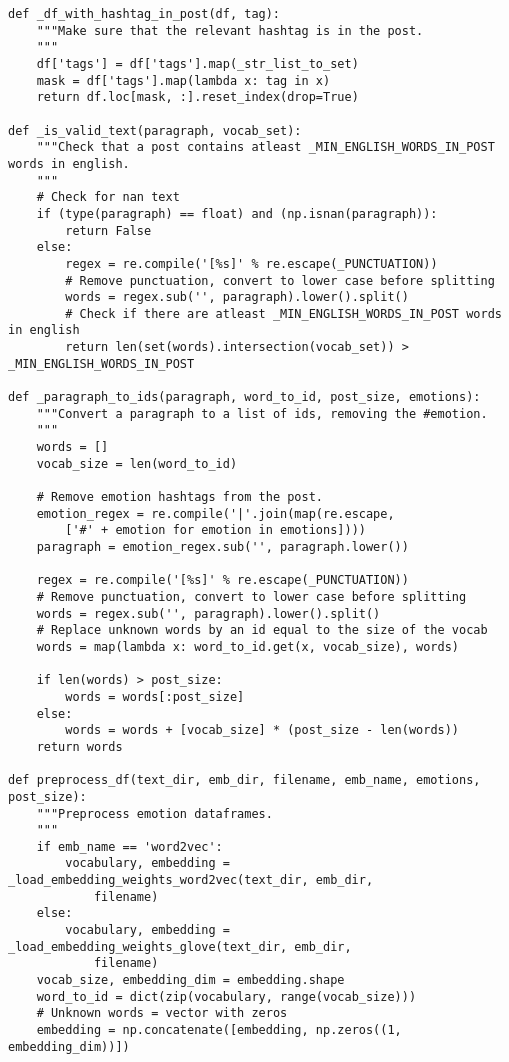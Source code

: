 \begin{lstlisting}
def _df_with_hashtag_in_post(df, tag):
    """Make sure that the relevant hashtag is in the post.
    """
    df['tags'] = df['tags'].map(_str_list_to_set)
    mask = df['tags'].map(lambda x: tag in x)
    return df.loc[mask, :].reset_index(drop=True)

def _is_valid_text(paragraph, vocab_set):
    """Check that a post contains atleast _MIN_ENGLISH_WORDS_IN_POST words in english.
    """
    # Check for nan text
    if (type(paragraph) == float) and (np.isnan(paragraph)):
        return False
    else:
        regex = re.compile('[%s]' % re.escape(_PUNCTUATION))
        # Remove punctuation, convert to lower case before splitting
        words = regex.sub('', paragraph).lower().split()
        # Check if there are atleast _MIN_ENGLISH_WORDS_IN_POST words in english
        return len(set(words).intersection(vocab_set)) > _MIN_ENGLISH_WORDS_IN_POST

def _paragraph_to_ids(paragraph, word_to_id, post_size, emotions):
    """Convert a paragraph to a list of ids, removing the #emotion.
    """
    words = []
    vocab_size = len(word_to_id)

    # Remove emotion hashtags from the post.
    emotion_regex = re.compile('|'.join(map(re.escape, 
        ['#' + emotion for emotion in emotions])))
    paragraph = emotion_regex.sub('', paragraph.lower())

    regex = re.compile('[%s]' % re.escape(_PUNCTUATION))
    # Remove punctuation, convert to lower case before splitting
    words = regex.sub('', paragraph).lower().split()
    # Replace unknown words by an id equal to the size of the vocab
    words = map(lambda x: word_to_id.get(x, vocab_size), words)
        
    if len(words) > post_size:
        words = words[:post_size]
    else:
        words = words + [vocab_size] * (post_size - len(words))
    return words

def preprocess_df(text_dir, emb_dir, filename, emb_name, emotions, post_size):
    """Preprocess emotion dataframes.
    """
    if emb_name == 'word2vec':
        vocabulary, embedding = _load_embedding_weights_word2vec(text_dir, emb_dir, 
            filename)
    else:
        vocabulary, embedding = _load_embedding_weights_glove(text_dir, emb_dir, 
            filename)
    vocab_size, embedding_dim = embedding.shape
    word_to_id = dict(zip(vocabulary, range(vocab_size)))
    # Unknown words = vector with zeros
    embedding = np.concatenate([embedding, np.zeros((1, embedding_dim))])


\end{lstlisting}
